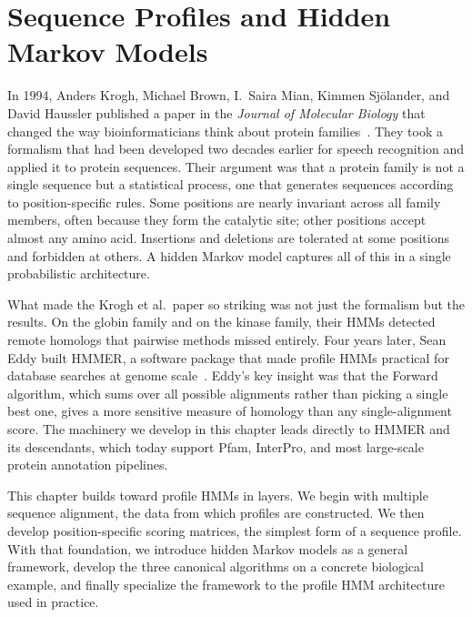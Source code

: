 \chapter{Sequence Profiles and Hidden Markov Models}
\label{ch:profile-hmm}

In 1994, Anders Krogh, Michael Brown, I.\ Saira Mian, Kimmen Sj\"olander, and David Haussler published a paper in the \textit{Journal of Molecular Biology} that changed the way bioinformaticians think about protein families~\cite{krogh1994}.
They took a formalism that had been developed two decades earlier for speech recognition and applied it to protein sequences.
Their argument was that a protein family is not a single sequence but a statistical process, one that generates sequences according to position-specific rules.
Some positions are nearly invariant across all family members, often because they form the catalytic site; other positions accept almost any amino acid.
Insertions and deletions are tolerated at some positions and forbidden at others.
A hidden Markov model captures all of this in a single probabilistic architecture.

What made the Krogh et al.\ paper so striking was not just the formalism but the results.
On the globin family and on the kinase family, their HMMs detected remote homologs that pairwise methods missed entirely.
Four years later, Sean Eddy built HMMER, a software package that made profile HMMs practical for database searches at genome scale~\cite{eddy2011}.
Eddy's key insight was that the Forward algorithm, which sums over all possible alignments rather than picking a single best one, gives a more sensitive measure of homology than any single-alignment score.
The machinery we develop in this chapter leads directly to HMMER and its descendants, which today support Pfam, InterPro, and most large-scale protein annotation pipelines.

This chapter builds toward profile HMMs in layers.
We begin with multiple sequence alignment, the data from which profiles are constructed.
We then develop position-specific scoring matrices, the simplest form of a sequence profile.
With that foundation, we introduce hidden Markov models as a general framework, develop the three canonical algorithms on a concrete biological example, and finally specialize the framework to the profile HMM architecture used in practice.


